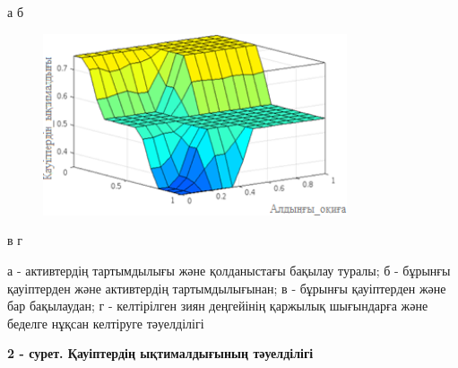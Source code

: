 а б

\begin{figure}[H]
	\centering
	\includegraphics[width=0.8\textwidth]{media/ict/image29}
	\caption*{}
\end{figure}


в г

а - активтердің тартымдылығы және қолданыстағы бақылау туралы; б -
бұрынғы қауіптерден және активтердің тартымдылығынан; в - бұрынғы
қауіптерден және бар бақылаудан; г - келтірілген зиян деңгейінің
қаржылық шығындарға және беделге нұқсан келтіруге тәуелділігі

{\bfseries 2 - сурет. Қауіптердің ықтималдығының тәуелділігі}

